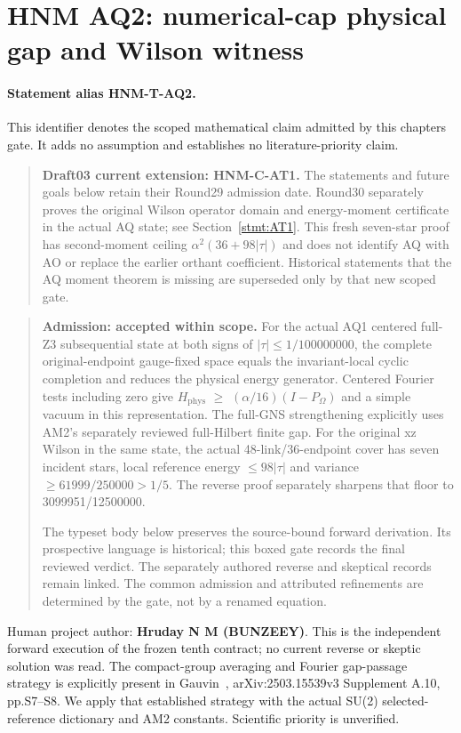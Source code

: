 \hypertarget{r29-aq2-aq2-forward-hnm-numerical-cap-physical-gap-and-wilson-witness}{%
\section{HNM AQ2: numerical-cap physical gap and Wilson witness\workstar}\label{r29:aq2:r29-aq2-aq2-forward-hnm-numerical-cap-physical-gap-and-wilson-witness}}
\paragraph{Statement alias HNM-T-AQ2.}\label{stmt:AQ2} This identifier denotes the scoped mathematical claim admitted by this chapter\textquotesingle s gate. It adds no assumption and establishes no literature-priority claim.

\begin{quote}\small\textbf{Draft03 current extension: HNM-C-AT1.} The statements and future goals below retain their Round29 admission date. Round30 separately proves the original Wilson operator domain and energy-moment certificate in the actual AQ state; see Section~\ref{stmt:AT1}. This fresh seven-star proof has second-moment ceiling $\alpha^2(36+98|\tau|)$ and does not identify AQ with AO or replace the earlier orthant coefficient. Historical statements that the AQ moment theorem is missing are superseded only by that new scoped gate.\end{quote}

\begin{quote}\small \textbf{Admission: accepted within scope.} For the actual AQ1 centered full-Z3 subsequential state at both signs of \(|\tau|\le 1/100000000\), the complete original-endpoint gauge-fixed space equals the invariant-local cyclic completion and reduces the physical energy generator. Centered Fourier tests including zero give \(H_{\mathrm{phys}}\) \(\ge \) \((\alpha/16)(I-P_\Omega)\) and a simple vacuum in this representation. The full-GNS strengthening explicitly uses AM2's separately reviewed full-Hilbert finite gap. For the original xz Wilson in the same state, the actual 48-link/36-endpoint cover has seven incident stars, local reference energy \(\le 98|\tau|\) and variance \(\ge 61999/250000>1/5\). The reverse proof separately sharpens that floor to 3099951/12500000.\par The typeset body below preserves the source-bound forward derivation. Its prospective language is historical; this boxed gate records the final reviewed verdict. The separately authored reverse and skeptical records remain linked. The common admission and attributed refinements are determined by the gate, not by a renamed equation.\end{quote}
Human project author: \textbf{Hruday N M (BUNZEEY)}. This is the independent forward execution of the frozen tenth contract; no current reverse or skeptic solution was read. The compact-group averaging and Fourier gap-passage strategy is explicitly present in Gauvin~\citep{gauvin2026}, arXiv:2503.15539v3 Supplement A.10, pp.S7--S8. We apply that established strategy with the actual SU(2) selected-reference dictionary and AM2 constants. Scientific priority is unverified.

